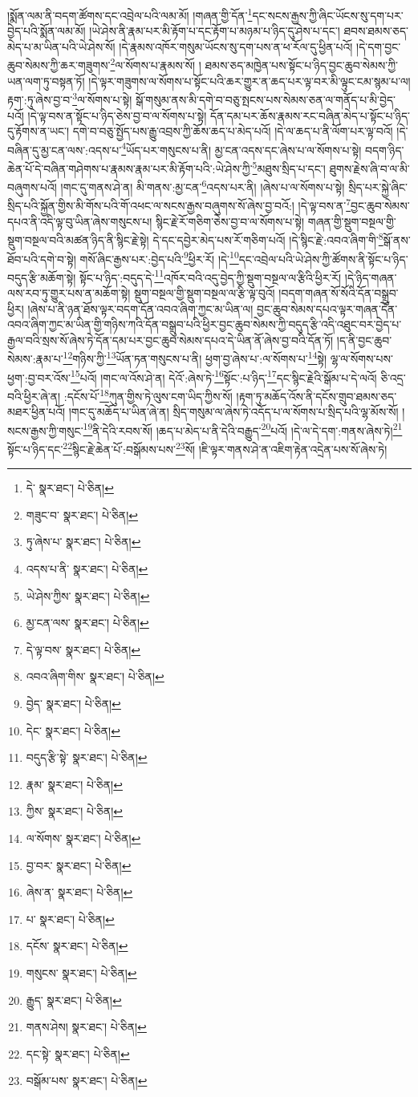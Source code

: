 །སྨོན་ལམ་ནི་བདག་ཚོགས་དང་འབྲེལ་པའི་ལམ་མོ། །གཞན་གྱི་དོན་\footnote{དེ་  སྣར་ཐང་།  པེ་ཅིན། }དང་སངས་རྒྱས་ཀྱི་ཞིང་ཡོངས་སུ་དག་པར་བྱེད་པའི་སྨོན་ལམ་མོ། །ཡེ་ཤེས་ནི་རྣམ་པར་མི་རྟོག་པ་དང་རྟོག་པ་མཉམ་པ་ཉིད་དུ་ཤེས་པ་དང་། ཐབས་ཐམས་ཅད་མེད་པ་མ་ཡིན་པའི་ཡེ་ཤེས་སོ། །དེ་རྣམས་འཁོར་གསུམ་ཡོངས་སུ་དག་པས་ན་ཕ་རོལ་དུ་ཕྱིན་པའོ། །དེ་དག་བྱང་ཆུབ་སེམས་ཀྱི་ཆར་གཟུགས་\footnote{གཟུང་བ་  སྣར་ཐང་།  པེ་ཅིན། }ལ་སོགས་པ་རྣམས་སོ། །
ཐམས་ཅད་མཁྱེན་པས་སྟོང་པ་ཉིད་བྱང་ཆུབ་སེམས་ཀྱི་ཡན་ལག་ཏུ་བསྟན་ཏོ། །དེ་ལྟར་གཟུགས་ལ་སོགས་པ་སྟོང་པའི་ཆར་གྱུར་ན་ཆད་པར་ལྟ་བར་མི་ལྟུང་ངམ་སྙམ་པ་ལ། རྟག་:ཏུ་ཞེས་བྱ་བ་\footnote{ཏུ་ཞེས་པ་  སྣར་ཐང་།  པེ་ཅིན། }ལ་སོགས་པ་སྟེ། སྒོ་གསུམ་ནས་མི་དགེ་བ་བཅུ་སྤངས་པས་སེམས་ཅན་ལ་གནོད་པ་མི་བྱེད་པའོ། །དེ་ལྟ་བས་ན་སྟོང་པ་ཉིད་ཅེས་བྱ་བ་ལ་སོགས་པ་སྟེ། དོན་དམ་པར་ཆོས་རྣམས་རང་བཞིན་མེད་པ་སྟོང་པ་ཉིད་དུ་རྟོགས་ན་ཡང་། དགེ་བ་བཅུ་སྤྱོད་པས་རྒྱུ་འབྲས་ཀྱི་ཆོས་ཆད་པ་མེད་པའོ། །དེ་ལ་ཆད་པ་ནི་ལོག་པར་ལྟ་བའོ། །དེ་བཞིན་དུ་མྱ་ངན་ལས་:འདས་པ་\footnote{འདས་པ་ནི་  སྣར་ཐང་།  པེ་ཅིན། }ཡོད་པར་གསུངས་པ་ནི། མྱ་ངན་འདས་དང་ཞེས་པ་ལ་སོགས་པ་སྟེ། བདག་ཉིད་ཆེན་པོ་དེ་བཞིན་གཤེགས་པ་རྣམས་རྣམ་པར་མི་རྟོག་པའི་:ཡེ་ཤེས་ཀྱི་\footnote{ཡེ་ཤེས་ཀྱིས་  སྣར་ཐང་།  པེ་ཅིན། }མཐུས་སྲིད་པ་དང་། ཐུགས་རྗེས་ཞི་བ་ལ་མི་བཞུགས་པའོ། །གང་དུ་གནས་ཤེ་ན། མི་གནས་:མྱ་ངན་\footnote{མྱ་ངན་ལས་  སྣར་ཐང་།  པེ་ཅིན། }འདས་པར་ནི། །ཞེས་པ་ལ་སོགས་པ་སྟེ། སྲིད་པར་སྐྱེ་ཞིང་སྲིད་པའི་སྐྱོན་གྱིས་མི་གོས་པའི་གོ་འཕང་ལ་སངས་རྒྱས་བཞུགས་སོ་ཞེས་བྱ་བའོ:། །དེ་ལྟ་བས་ན་\footnote{དེ་ལྟ་བས་  སྣར་ཐང་།  པེ་ཅིན། }བྱང་ཆུབ་སེམས་དཔའ་ནི་འདི་ལྟ་བུ་ཡིན་ཞེས་གསུངས་པ། སྙིང་རྗེ་རོ་གཅིག་ཅེས་བྱ་བ་ལ་སོགས་པ་སྟེ། གཞན་གྱི་སྡུག་བསྔལ་གྱི་སྡུག་བསྔལ་བའི་མཚན་ཉིད་ནི་སྙིང་རྗེ་སྟེ། དེ་དང་དབྱེར་མེད་པས་རོ་གཅིག་པའོ། །དེ་སྙིང་རྗེ་:འབའ་ཞིག་གི་\footnote{འབའ་ཞིག་གིས་  སྣར་ཐང་།  པེ་ཅིན། }སྒོ་ནས་ཐོབ་པའི་དགེ་བ་སྟེ། གསོ་ཞིང་རྒྱས་པར་:བྱེད་པའི་\footnote{བྱེད་  སྣར་ཐང་།  པེ་ཅིན། }ཕྱིར་རོ། །དེ་\footnote{དེང་  སྣར་ཐང་།  པེ་ཅིན། }དང་འབྲེལ་པའི་ཡེ་ཤེས་ཀྱི་ཚོགས་ནི་སྟོང་པ་ཉིད་བདུད་རྩི་མཆོག་སྟེ། སྟོང་པ་ཉིད་:བདུད་དེ་\footnote{བདུད་རྩི་སྟེ་  སྣར་ཐང་།  པེ་ཅིན། }འཁོར་བའི་འདུ་བྱེད་ཀྱི་སྡུག་བསྔལ་ལ་རྩིའི་ཕྱིར་རོ། །དེ་ཉིད་གཞན་ལས་རབ་ཏུ་གྱུར་པས་ན་མཆོག་སྟེ། སྡུག་བསྔལ་གྱི་སྡུག་བསྔལ་ལ་རྩི་ལྟ་བུའོ། །བདག་གཞན་སོ་སོའི་དོན་བསྒྲུབ་ཕྱིར། །ཞེས་པ་ནི་ཉན་ཐོས་ལྟར་བདག་དོན་འབའ་ཞིག་ཀྱང་མ་ཡིན་ལ། བྱང་ཆུབ་སེམས་དཔའ་ལྟར་གཞན་དོན་འབའ་ཞིག་ཀྱང་མ་ཡིན་གྱི་གཉིས་ཀའི་དོན་བསྒྲུབ་པའི་ཕྱིར་བྱང་ཆུབ་སེམས་ཀྱི་བདུད་རྩི་འདི་འཐུང་བར་བྱེད་པ་རྒྱལ་བའི་སྲས་སོ་ཞེས་ཏེ་དོན་དམ་པར་བྱང་ཆུབ་སེམས་དཔའ་དེ་ཡིན་ནོ་ཞེས་བྱ་བའི་དོན་ཏོ། །ད་ནི་བྱང་ཆུབ་སེམས་:རྣམ་པ་\footnote{རྣམ་  སྣར་ཐང་།  པེ་ཅིན། }གཉིས་ཀྱི་\footnote{ཀྱིས་  སྣར་ཐང་།  པེ་ཅིན། }ཡོན་ཏན་གསུངས་པ་ནི། ཕྱག་བྱ་ཞེས་པ་:ལ་སོགས་པ་\footnote{ལ་སོགས་  སྣར་ཐང་།  པེ་ཅིན། }སྟེ། ལྷ་ལ་སོགས་པས་ཕྱག་:བྱ་བར་འོས་\footnote{བྱ་བར་  སྣར་ཐང་།  པེ་ཅིན། }པའོ། །གང་ལ་འོས་ཤེ་ན། དེའོ་:ཞེས་ཏེ་\footnote{ཞེས་ན་  སྣར་ཐང་།  པེ་ཅིན། }སྟོང་:པ་ཉིད་\footnote{པ་  སྣར་ཐང་།  པེ་ཅིན། }དང་སྙིང་རྗེའི་སྒོམ་པ་དེ་ལའོ། ཅི་འདྲ་བའི་ཕྱིར་ཞེ་ན། :དངོས་པོ་\footnote{དངོས་  སྣར་ཐང་།  པེ་ཅིན། }ཀུན་གྱིས་ཏེ་ལུས་ངག་ཡིད་ཀྱིས་སོ། །རྟག་ཏུ་མཆོད་འོས་ནི་དངོས་གྲུབ་ཐམས་ཅད་མཐར་ཕྱིན་པའོ། །གང་དུ་མཆོད་པ་ཡིན་ཞེ་ན། སྲིད་གསུམ་ལ་ཞེས་ཏེ་འདོད་པ་ལ་སོགས་པ་སྲིད་པའི་ལྷ་མོས་སོ། །སངས་རྒྱས་ཀྱི་གསུང་\footnote{གསུངས་  སྣར་ཐང་།  པེ་ཅིན། }ནི་དེའི་རབས་སོ། །ཆད་པ་མེད་པ་ནི་དེའི་བརྒྱུད་\footnote{རྒྱུད་  སྣར་ཐང་།  པེ་ཅིན། }པའོ། །དེ་ལ་དེ་དག་:གནས་ཞེས་ཏེ།\footnote{གནས་ཤེས།  སྣར་ཐང་།  པེ་ཅིན། } སྟོང་པ་ཉིད་དང་\footnote{དང་སྟེ་  སྣར་ཐང་།  པེ་ཅིན། }སྙིང་རྗེ་ཆེན་པོ་:བསྒོམས་པས་\footnote{བསྒོམ་པས་  སྣར་ཐང་།  པེ་ཅིན། }སོ། །ཇི་ལྟར་གནས་ཤེ་ན་འཇིག་རྟེན་འདྲེན་པས་སོ་ཞེས་ཏེ། 